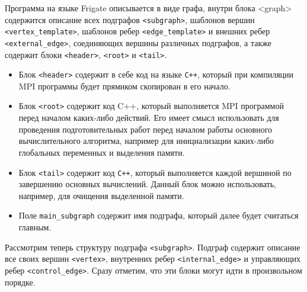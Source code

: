 \documentclass[a4paper, 12pt]{article}
\begin{document}
Программа на языке Frigate описывается в виде графа, внутри блока <graph> содержится описание всех подграфов \lstinline$<subgraph>$, шаблонов вершин \lstinline$<vertex_template>$, шаблонов ребер \lstinline$<edge_template>$ и внешних ребер \lstinline$<external_edge>$, соединяющих вершины различных подграфов, а также содержит блоки \lstinline$<header>$, \lstinline$<root>$ и \lstinline$<tail>$. 
\begin{itemize}
\item Блок \lstinline$<header>$  содержит в себе код на языке \lstinline$C++$, который при компиляции MPI программы будет прямиком скопирован в его начало. 
\item Блок \lstinline$<root>$ содержит код C++, который выполняется MPI программой перед началом каких-либо действий. Его имеет смысл использовать для проведения подготовительных работ перед началом работы основного вычислительного алгоритма, например для инициализации каких-либо глобальных переменных и выделения памяти. 
\item Блок \lstinline$<tail>$ содержит код \lstinline$C++$, который выполняется каждой вершиной по завершению основных вычислений. Данный блок можно использовать, например, для очищения выделенной памяти. 
\item Поле \lstinline$main_subgraph$ содержит имя подграфа, который далее будет считаться главным.
\end{itemize}
Рассмотрим теперь структуру подграфа \lstinline$<subgraph>$. Подграф содержит описание все своих вершин \lstinline$<vertex>$, внутренних ребер \lstinline$<internal_edge>$ и управляющих ребер \lstinline$<control_edge>$. Сразу отметим, что эти блоки могут идти в произвольном порядке.
\end{document}

